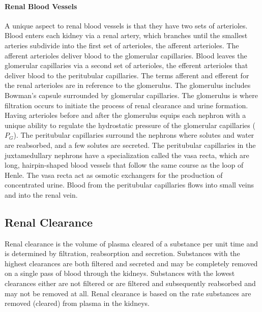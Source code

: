 \paragraph{Renal Blood Vessels}
A unique aspect to renal blood vessels is that they have two sets of arterioles. Blood enters each kidney via a renal artery, which branches until the smallest arteries subdivide into the first set of arterioles, the afferent arterioles. The afferent arterioles deliver blood to the glomerular capillaries. Blood leaves the glomerular capillaries via a second set of arterioles, the efferent arterioles that deliver blood to the peritubular capillaries. The terms afferent and efferent for the renal arterioles are in reference to the glomerulus. The glomerulus includes Bowman’s capsule surrounded by glomerular capillaries. The glomerulus is where filtration occurs to initiate the process of renal clearance and urine formation. Having arterioles before and after the glomerulus equips each nephron with a unique ability to regulate the hydrostatic pressure of the glomerular capillaries ($P_G$). The peritubular capillaries surround the nephrons where solutes and water are reabsorbed, and a few solutes are secreted. The peritubular capillaries in the juxtamedullary nephrons have a specialization called the vasa recta, which are long, hairpin-shaped blood vessels that follow the same course as the loop of Henle. The vasa recta act as osmotic exchangers for the production of concentrated urine. Blood from the peritubular capillaries flows into small veins and into the renal vein.

\subsection{Renal Clearance}

Renal clearance is the volume of plasma cleared of a substance per unit time and is determined by filtration, reabsorption and secretion. Substances with the highest clearances are both filtered and secreted and may be completely removed on a single pass of blood through the kidneys. Substances with the lowest clearances either are not filtered or are filtered and subsequently reabsorbed and may not be removed at all.  Renal clearance is based on the rate substances are removed (cleared) from plasma in the kidneys.

